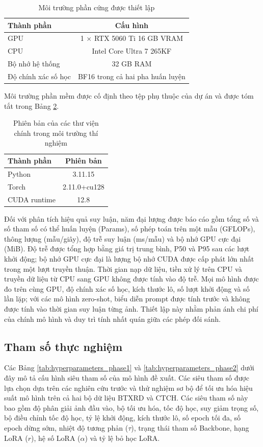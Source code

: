 \begin{table}[htbp]
\centering
\begin{tabular}{|l|c|}
\hline
\caption{Môi trường phần cứng được thiết lập}
\label{tab:hardware_environment}
\textbf{Thành phần} & \textbf{Cấu hình} \\ \hline
GPU & 1 $\times$ RTX 5060 Ti 16 GB VRAM \\ \hline
CPU & Intel Core Ultra 7 265KF \\ \hline
Bộ nhớ hệ thống & 32 GB RAM \\ \hline
Độ chính xác số học & BF16 trong cả hai pha huấn luyện \\ \hline
\end{tabular}
\end{table}

Môi trường phần mềm được cố định theo tệp phụ thuộc của dự án và được tóm tắt
trong Bảng \ref{tab:software_environment}.
\begin{table}[htbp]
\centering
\caption{Phiên bản của các thư viện chính trong môi trường thí nghiệm}
\label{tab:software_environment}
\begin{tabular}{|l|c|}
\hline
\textbf{Thành phần} & \textbf{Phiên bản} \\ \hline
Python & 3.11.15 \\ \hline
Torch & 2.11.0+cu128 \\ \hline
CUDA runtime & 12.8 \\ \hline
\end{tabular}
\end{table}

Đối với phân tích hiệu quả suy luận, năm đại lượng được báo cáo gồm tổng số và
số tham số có thể huấn luyện (Params), số phép toán trên một mẫu (GFLOPs), thông
lượng (mẫu/giây), độ trễ suy luận (ms/mẫu) và bộ nhớ GPU cực đại (MiB). Độ trễ
được tổng hợp bằng giá trị trung bình, P50 và P95 sau các lượt khởi động; bộ nhớ
GPU cực đại là lượng bộ nhớ CUDA được cấp phát lớn nhất trong một lượt truyền
thuận. Thời gian nạp dữ liệu, tiền xử lý trên CPU và truyền dữ liệu từ CPU sang
GPU không được tính vào độ trễ. Mọi mô hình được đo trên cùng GPU, độ chính xác
số học, kích thước lô, số lượt khởi động và số lần lặp; với các mô hình
zero-shot, biểu diễn prompt được tính trước và không được tính vào thời gian suy
luận từng ảnh. Thiết lập này nhằm phản ánh chi phí của chính mô hình và duy trì
tính nhất quán giữa các phép đối sánh.

\subsection{Tham số thực nghiệm}
Các Bảng \ref{tab:hyperparameters_phase1} và \ref{tab:hyperparameters_phase2} dưới đây mô tả cấu hình siêu tham số của mô hình đề xuất. Các siêu tham số được lựa chọn dựa trên các nghiên cứu trước và thử nghiệm sơ bộ để tối ưu hóa hiệu suất mô hình trên cả hai bộ dữ liệu BTXRD và CTCH. Các siêu tham số này bao gồm độ phân giải ảnh đầu vào, bộ tối ưu hóa, tốc độ học, suy giảm trọng số, bộ điều chỉnh tốc độ học, tỷ lệ khởi động, kích thước lô, số epoch tối đa, số epoch dừng sớm, nhiệt độ tương phản ($\tau$), trạng thái tham số Backbone, hạng LoRA ($r$), hệ số LoRA ($\alpha$) và tỷ lệ bỏ học LoRA.

